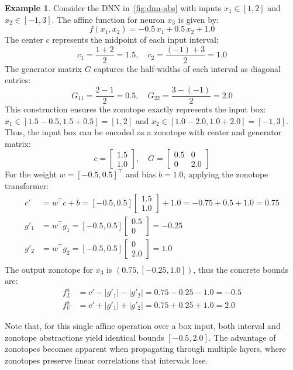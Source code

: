 \documentclass[oneside,11pt,dvipsnames]{book}
\numberwithin{equation}{section}
\theoremstyle{definition}
\newtheorem{example}{Example}[section]
\theoremstyle{remark}
\begin{document}
\begin{example}
Consider the DNN in~\autoref{fig:dnn-abs} with inputs \(x_1 \in [1, 2]\) and \(x_2 \in [-1, 3]\). The affine function for neuron \(x_3\) is given by:
\[
f(x_1,x_2) = -0.5\,x_1 + 0.5\,x_2 + 1.0
\]
The center \(c\) represents the midpoint of each input interval:
\[
c_1 = \frac{1+2}{2} = 1.5, \quad c_2 = \frac{(-1)+3}{2} = 1.0
\]
The generator matrix \(G\) captures the half-widths of each interval as diagonal entries:
\[
G_{11} = \frac{2-1}{2} = 0.5, \quad G_{22} = \frac{3-(-1)}{2} = 2.0
\]
This construction ensures the zonotope exactly represents the input box: \(x_1 \in [1.5-0.5, 1.5+0.5] = [1,2]\) and \(x_2 \in [1.0-2.0, 1.0+2.0] = [-1,3]\).
Thus, the input box can be encoded as a zonotope with center and generator matrix:
\[
c = \begin{bmatrix}1.5 \\ 1.0\end{bmatrix}, \quad G = \begin{bmatrix}0.5 & 0 \\ 0 & 2.0\end{bmatrix}
\]
For the weight \(w = [-0.5, 0.5]^\top\) and bias \(b = 1.0\), applying the zonotope transformer:
\begin{equation}
\begin{aligned}
c' &= w^\top c + b = [-0.5, 0.5] \begin{bmatrix}1.5 \\ 1.0\end{bmatrix} + 1.0 = -0.75 + 0.5 + 1.0 = 0.75 \\
g'_1 &= w^\top g_1 = [-0.5, 0.5] \begin{bmatrix}0.5 \\ 0\end{bmatrix} = -0.25 \\
g'_2 &= w^\top g_2 = [-0.5, 0.5] \begin{bmatrix}0 \\ 2.0\end{bmatrix} = 1.0 \\
\end{aligned}
\end{equation}
The output zonotope for \(x_3\) is \((0.75, [-0.25, 1.0])\), thus the concrete bounds are:
\begin{equation}
\begin{aligned}
    f^a_L &= c' - |g'_1| - |g'_2| = 0.75 - 0.25 - 1.0 = -0.5 \\
    f^a_U &= c' + |g'_1| + |g'_2| = 0.75 + 0.25 + 1.0 = 2.0
\end{aligned}
\end{equation}

Note that, for this single affine operation over a box input, both interval and zonotope abstractions yield identical bounds \([-0.5, 2.0]\). The advantage of zonotopes becomes apparent when propagating through multiple layers, where zonotopes preserve linear correlations that intervals lose.
\end{example}
\end{document}
